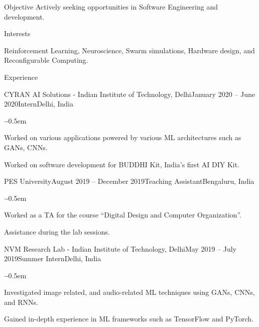 \documentclass{CV} %
\begin{document}
\begin{rSection}{Objective}
  Actively seeking opportunities in Software Engineering and development.
\end{rSection}


\begin{rSection}{Interests}
  \begin{flushleft}
      Reinforcement Learning, Neuroscience, Swarm simulations, Hardware design, and Reconfigurable Computing.
  \end{flushleft}
\end{rSection}


\begin{rSection}{Experience}
  \begin{rSubsection}{CYRAN AI Solutions - Indian Institute of Technology, Delhi}{January 2020 -- June 2020}{Intern}{Delhi, India}
    \begin{list}{$\cdot$}{\footnotesize}\itemsep -0.5em \vspace{-0.5em}
      \item Worked on various applications powered by various ML architectures such as GANs, CNNs.
      \item Worked on software development for BUDDHI Kit, India’s first AI DIY Kit.
    \end{list}
  \end{rSubsection}

  \begin{rSubsection}{PES University}{August 2019 -- December 2019}{Teaching Assistant}{Bengaluru, India}
    \begin{list}{$\cdot$}{\footnotesize}\itemsep -0.5em \vspace{-0.5em}
      \item Worked as a TA for the course ``Digital Design and Computer Organization''.
      \item Assistance during the lab sessions.
    \end{list}
  \end{rSubsection}

  \begin{rSubsection}{NVM Research Lab - Indian Institute of Technology, Delhi}{May 2019 -- July 2019}{Summer Intern}{Delhi, India}
    \begin{list}{$\cdot$}{\footnotesize}\itemsep -0.5em \vspace{-0.5em}
      \item Investigated image related, and audio-related ML techniques using GANs, CNNs, and RNNs.
      \item Gained in-depth experience in ML frameworks such as TensorFlow and PyTorch.
    \end{list}
  \end{rSubsection}


\end{rSection}
\end{document}

